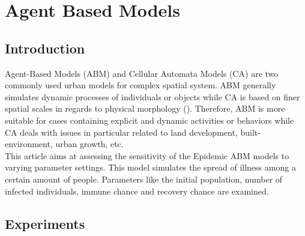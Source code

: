 \documentclass[a4paper,reqno,]{article}
\begin{document}
\newpage
\section{Agent Based Models}
\label{sec:abm}
\subsection{Introduction}
Agent-Based Models (ABM) and Cellular Automata Models (CA) are two commonly used urban models for complex spatial system. ABM generally simulates dynamic processes of individuals or objects while CA is based on finer spatial scales in regards to physical morphology (\cite{batty1997cellular}). Therefore, ABM is more suitable for cases containing explicit and dynamic activities or behaviors while CA deals with issues in particular related to land development, built-environment, urban growth, etc. 
\\This article aims at assessing the sensitivity of the Epidemic ABM models to varying parameter settings. This model simulates the spread of illness among a certain amount of people. Parameters like the initial population, number of infected individuals, immune chance and recovery chance are examined.
\subsection{Experiments}
\end{document}
